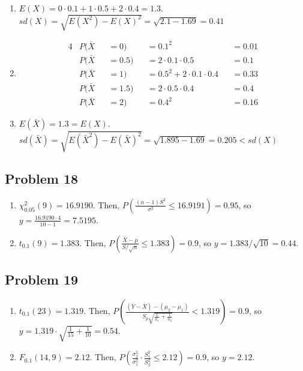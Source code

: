 \documentclass{article}
\begin{document}
\begin{enumerate}
	\item $E(X) = 0 \cdot 0.1 + 1 \cdot 0.5 + 2 \cdot 0.4 = \boxed{1.3}$.
		$sd(X) = \sqrt{E(X^2) - E(X)^2} = \sqrt{2.1 - 1.69} = \boxed{0.41}$
	\item
		\begin{alignat*}{4}
			& P(\bar{X} &&= 0) &&= 0.1^2 &&= 0.01 \\
			& P(\bar{X} &&= 0.5) &&= 2 \cdot 0.1 \cdot 0.5 &&= 0.1 \\
			& P(\bar{X} &&= 1) &&= 0.5^2 + 2 \cdot 0.1 \cdot 0.4 &&= 0.33 \\
			& P(\bar{X} &&= 1.5) &&= 2 \cdot 0.5 \cdot 0.4 &&= 0.4 \\
			& P(\bar{X} &&= 2) &&= 0.4^2 &&= 0.16
		\end{alignat*}
	\item $E(\bar{X}) = \boxed{1.3} = E(X)$.
		$sd(\bar{X}) = \sqrt{E(\bar{X}^2) - E(\bar{X})^2} = \sqrt{1.895 - 1.69} = \boxed{0.205} < sd(X)$
\end{enumerate}

\subsection*{Problem 18}

\begin{enumerate}
	\item $\chi_{0.05}^2(9) = 16.9190$.
		Then, $P(\frac{(n-1) S^2}{\sigma^2} \le 16.9191) = 0.95$,
		so $y = \frac{16.9190 \cdot 4}{10-1} = 7.5195$.
	\item $t_{0.1}(9) = 1.383$.
		Then, $P(\frac{\bar{X} - \mu}{S/\sqrt{n}} \le 1.383) = 0.9$,
		so $y = 1.383 / \sqrt{10} = 0.44$.
\end{enumerate}

\subsection*{Problem 19}

\begin{enumerate}
	\item $t_{0.1}(23) = 1.319$.
		Then, $P(\frac{(\bar{Y} - \bar{X}) - (\mu_2 - \mu_1)}{S_p \sqrt{\frac{1}{n_1} + \frac{1}{n_2}}} < 1.319) = 0.9$,
		so $y = 1.319 \cdot \sqrt{\frac{1}{15} + \frac{1}{10}} = 0.54$.
	\item $F_{0.1}(14, 9) = 2.12$.
		Then, $P(\frac{\sigma_2^2}{\sigma_1^2} \cdot \frac{S_1^2}{S_2^2} \le 2.12) = 0.9$,
		so $y = 2.12$.
\end{enumerate}
\end{document}
